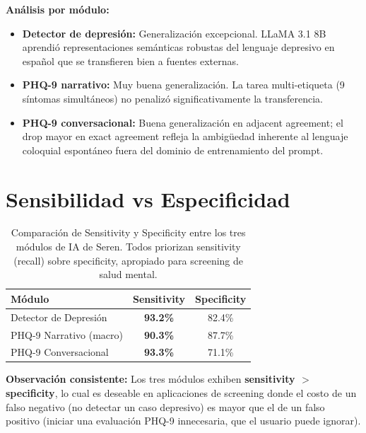 \textbf{Análisis por módulo:}
\begin{itemize}
    \item \textbf{Detector de depresión:} Generalización excepcional. LLaMA 3.1 8B
          aprendió representaciones semánticas robustas del lenguaje depresivo en español
          que se transfieren bien a fuentes externas.

    \item \textbf{PHQ-9 narrativo:} Muy buena generalización. La tarea multi-etiqueta
          (9 síntomas simultáneos) no penalizó significativamente la transferencia.

    \item \textbf{PHQ-9 conversacional:} Buena generalización en adjacent agreement;
          el drop mayor en exact agreement refleja la ambigüedad inherente al lenguaje
          coloquial espontáneo fuera del dominio de entrenamiento del prompt.
\end{itemize}

\section{Sensibilidad vs Especificidad}

\begin{table}[H]
\centering
\caption{Comparación de Sensitivity y Specificity entre los tres módulos de IA de Seren.
         Todos priorizan sensitivity (recall) sobre specificity, apropiado para
         screening de salud mental.}
\label{tab:sens_spec_seren}
\begin{tabular}{lcc}
\toprule
\textbf{Módulo}                  & \textbf{Sensitivity} & \textbf{Specificity} \\
\midrule
Detector de Depresión            & \textbf{93.2\%}      & 82.4\%               \\
PHQ-9 Narrativo (macro)          & \textbf{90.3\%}      & 87.7\%               \\
PHQ-9 Conversacional             & \textbf{93.3\%}      & 71.1\%               \\
\bottomrule
\end{tabular}
\end{table}

\textbf{Observación consistente:}
Los tres módulos exhiben \textbf{sensitivity $>$ specificity}, lo cual es deseable en
aplicaciones de screening donde el costo de un falso negativo (no detectar un caso
depresivo) es mayor que el de un falso positivo (iniciar una evaluación PHQ-9
innecesaria, que el usuario puede ignorar).


